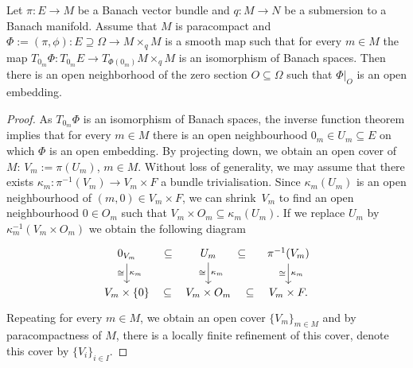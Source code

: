 \begin{Lemma}\label{lem:loc2glob_emb}
Let $\pi \colon E\rightarrow M$ be a Banach vector bundle and $q \colon M \rightarrow N$ be a submersion to a Banach manifold. Assume that $M$ is paracompact and $\Phi := (\pi,\phi) \colon E \supseteq \Omega \rightarrow M \times_q M$ is a smooth map such that for every $m\in M$ the map $T_{0_m} \Phi \colon T_{0_m}E \rightarrow T_{\Phi(0_m)}M \times_q M$ is an isomorphism of Banach spaces. Then there is an open neighborhood of the zero section $O\subseteq \Omega$ such that $\Phi|_O$ is an open embedding.
\end{Lemma}
\begin{proof}
As $T_{0_m}\Phi$ is an isomorphism of Banach spaces, the inverse function theorem implies that for every $m \in M$ there is an open neighbourhood $0_m \in U_{m} \subseteq E$ on which $\Phi$ is an open embedding.
By projecting down, we obtain an open cover of $M$:
$V_{m} := \pi(U_{m})$, $m \in M$.
Without loss of generality, we may assume that there exists $\kappa_m \colon \pi^{-1}(V_{m}) \rightarrow V_m \times F$ a bundle trivialisation.
Since $\kappa_{m}(U_{m})$ is an open neighbourhood of $(m,0) \in V_{m} \times F$, we can shrink~$V_{m}$ to find an open neighbourhood $0 \in O_{m}$ such that $V_{m} \times O_{m} \subseteq \kappa_{m}(U_{m})$.
If we replace $U_{m}$ by~$\kappa_{m}^{-1}(V_{m} \times O_{m})$ we obtain the following diagram
\begin{equation*}
 \begin{tikzcd}
 0_{V_{m}} \arrow[r, phantom, sloped, "\subseteq"] \ar[d,"\kappa_{m}", "\cong"'] & U_{m} \arrow[r, phantom, sloped, "\subseteq"] \ar[d,"\kappa_{m}", "\cong"'] & \pi^{-1}(V_{m}) \ar[d,"\kappa_{m}", "\cong"'] \\
 V_{m} \times \{ 0 \} \arrow[r, phantom, sloped, "\subseteq"] & V_{m} \times O_{m} \arrow[r, phantom, sloped, "\subseteq"] & V_{m} \times F.
 \end{tikzcd}
\end{equation*}
Repeating for every $m \in M$, we obtain an open cover $\{ V_{m} \}_{m \in M}$ and by paracompactness of $M$, there is a locally finite refinement of this cover, denote this cover by $\{V_i\}_{i\in I}$.


\end{proof}
